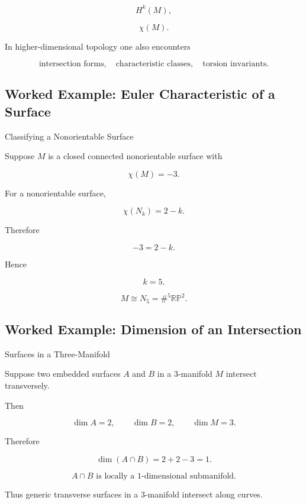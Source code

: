 \[
\boxed{
H^k(M),
}
\]

\[
\boxed{
\chi(M).
}
\]

In higher-dimensional topology one also encounters

\[
\boxed{
\text{intersection forms},
\quad
\text{characteristic classes},
\quad
\text{torsion invariants}.
}
\]

\subsection{Worked Example: Euler Characteristic of a Surface}
\label{subsec:worked-euler-surface-geometric}

\begin{workedexamplebox}{Classifying a Nonorientable Surface}

Suppose \(M\) is a closed connected nonorientable surface with

\[
\chi(M)=-3.
\]

For a nonorientable surface,

\[
\chi(N_k)=2-k.
\]

Therefore

\[
-3=2-k.
\]

Hence

\[
k=5.
\]

\begin{answerbox}
\[
\boxed{
M\cong N_5
=
\#^5\mathbb{RP}^2.
}
\]
\end{answerbox}
\end{workedexamplebox}

\subsection{Worked Example: Dimension of an Intersection}
\label{subsec:worked-intersection-geometric}

\begin{workedexamplebox}{Surfaces in a Three-Manifold}

Suppose two embedded surfaces \(A\) and \(B\) in a \(3\)-manifold \(M\)
intersect transversely.

Then

\[
\dim A=2,
\qquad
\dim B=2,
\qquad
\dim M=3.
\]

Therefore

\[
\dim(A\cap B)
=
2+2-3
=
1.
\]

\begin{answerbox}
\[
\boxed{
A\cap B
\text{ is locally a }1\text{-dimensional submanifold}.
}
\]
\end{answerbox}

Thus generic transverse surfaces in a \(3\)-manifold intersect along curves.
\end{workedexamplebox}

